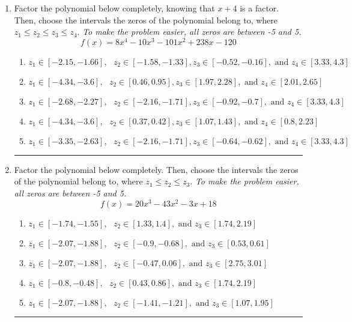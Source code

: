\documentclass[14pt]{extbook}
\newcommand{\litem}[1]{\item#1\hspace*{-1cm}\rule{\textwidth}{0.4pt}}
\begin{document}
\begin{enumerate}
{\begin{enumerate}[label=\Alph*.]
\end{enumerate} }
\litem{
Factor the polynomial below completely, knowing that $x + 4$ is a factor. Then, choose the intervals the zeros of the polynomial belong to, where $z_1 \leq z_2 \leq z_3 \leq z_4$. \textit{To make the problem easier, all zeros are between -5 and 5.}\[ f(x) = 8x^{4} -10 x^{3} -101 x^{2} +238 x -120 \]\begin{enumerate}[label=\Alph*.]
\item \( z_1 \in [-2.15, -1.66], \text{   }  z_2 \in [-1.58, -1.33], z_3 \in [-0.52, -0.16], \text{   and   } z_4 \in [3.33, 4.3] \)
\item \( z_1 \in [-4.34, -3.6], \text{   }  z_2 \in [0.46, 0.95], z_3 \in [1.97, 2.28], \text{   and   } z_4 \in [2.01, 2.65] \)
\item \( z_1 \in [-2.68, -2.27], \text{   }  z_2 \in [-2.16, -1.71], z_3 \in [-0.92, -0.7], \text{   and   } z_4 \in [3.33, 4.3] \)
\item \( z_1 \in [-4.34, -3.6], \text{   }  z_2 \in [0.37, 0.42], z_3 \in [1.07, 1.43], \text{   and   } z_4 \in [0.8, 2.23] \)
\item \( z_1 \in [-3.35, -2.63], \text{   }  z_2 \in [-2.16, -1.71], z_3 \in [-0.64, -0.62], \text{   and   } z_4 \in [3.33, 4.3] \)

\end{enumerate} }
\litem{
Factor the polynomial below completely. Then, choose the intervals the zeros of the polynomial belong to, where $z_1 \leq z_2 \leq z_3$. \textit{To make the problem easier, all zeros are between -5 and 5.}\[ f(x) = 20x^{3} -43 x^{2} -3 x + 18 \]\begin{enumerate}[label=\Alph*.]
\item \( z_1 \in [-1.74, -1.55], \text{   }  z_2 \in [1.33, 1.4], \text{   and   } z_3 \in [1.74, 2.19] \)
\item \( z_1 \in [-2.07, -1.88], \text{   }  z_2 \in [-0.9, -0.68], \text{   and   } z_3 \in [0.53, 0.61] \)
\item \( z_1 \in [-2.07, -1.88], \text{   }  z_2 \in [-0.47, 0.06], \text{   and   } z_3 \in [2.75, 3.01] \)
\item \( z_1 \in [-0.8, -0.48], \text{   }  z_2 \in [0.43, 0.86], \text{   and   } z_3 \in [1.74, 2.19] \)
\item \( z_1 \in [-2.07, -1.88], \text{   }  z_2 \in [-1.41, -1.21], \text{   and   } z_3 \in [1.07, 1.95] \)


\end{enumerate}}
\end{enumerate}
\end{document}
